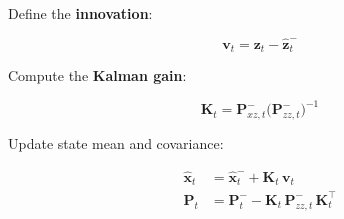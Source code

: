 \documentclass{article}
\renewcommand{\v}[1]{ \ensuremath{ {\mathbf{#1}} }}
\begin{document}
Define the \textbf{innovation}:

\begin{equation}
\v v_t = \v z_t - \hat{\v z}_{t}^{-}
\end{equation}

Compute the \textbf{Kalman gain}:

\begin{equation}
\v K_t = \v P_{xz,t}^{-} \bigl( \v P_{zz,t}^{-} \bigr)^{-1}
\end{equation}

Update state mean and covariance:

\begin{align}
\hat{\v x}_{t} &= \hat{\v x}_{t}^{-} + \v K_t \, \v v_t \\
\v P_{t} &= \v P_{t}^{-} - \v K_t \, \v P_{zz,t}^{-} \, \v K_t^\top
\end{align}



\newpage 
\end{document}
